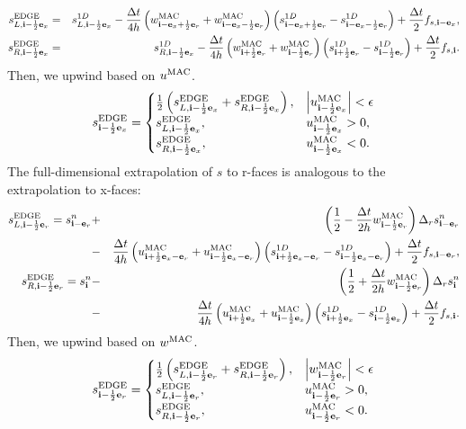 \documentclass[11pt]{article}
\def\half  {\frac{1}{2}}
\def\dt    {\Delta t}
\def\edge  {\rm EDGE}
\def\mac   {\rm MAC}
\def\eb    {{\bf e}}
\def\ib    {{\bf i}}
\begin{document}
\begin{eqnarray}
s_{L,\ib-\half\eb_x}^{\edge} &=& s_{L,\ib-\half\eb_x}^{1D} - \frac{\dt}{4h}\left(w_{\ib-\eb_x+\half\eb_r}^{\mac}+w_{\ib-\eb_x-\half\eb_r}^{\mac}\right)\left(s_{\ib-\eb_x+\half\eb_r}^{1D} - s_{\ib-\eb_x-\half\eb_r}^{1D}\right) + \frac{\dt}{2}f_{s,\ib-\eb_x}, \\
s_{R,\ib-\half\eb_x}^{\edge} &=& s_{R,\ib-\half\eb_x}^{1D} - \frac{\dt}{4h}\left(w_{\ib+\half\eb_r}^{\mac}+w_{\ib-\half\eb_r}^{\mac}\right)\left(s_{\ib+\half\eb_r}^{1D} - s_{\ib-\half\eb_r}^{1D}\right) + \frac{\dt}{2}f_{s,\ib}.
\end{eqnarray}
Then, we upwind based on $u^{\mac}$.
\begin{equation}
s_{\ib-\half\eb_x}^{\edge} =
\begin{cases}
\half\left(s_{L,\ib-\half\eb_x}^{\edge} + s_{R,\ib-\half\eb_x}^{\edge}\right), & \left|u^{\mac}_{\ib-\half\eb_x}\right| < \epsilon \\
s_{L,\ib-\half\eb_x}^{\edge}, & u^{\mac}_{\ib-\half\eb_x} > 0, \\
s_{R,\ib-\half\eb_x}^{\edge}, & u^{\mac}_{\ib-\half\eb_x} < 0.
\end{cases}
\end{equation}
The full-dimensional extrapolation of $s$ to r-faces is analogous to the extrapolation to x-faces:
\begin{eqnarray}
s_{L,\ib-\half\eb_r}^{\edge} = s_{\ib-\eb_r}^n &+& \left(\half - \frac{\dt}{2h}w_{\ib-\half\eb_r}^{\mac}\right)\Delta_r s_{\ib-\eb_r}^n \nonumber \\
&-& \frac{\dt}{4h}\left(u_{\ib+\half\eb_x-\eb_r}^{\mac}+u_{\ib-\half\eb_x-\eb_r}^{\mac}\right)\left(s_{\ib+\half\eb_x-\eb_r}^{1D} - s_{\ib-\half\eb_x-\eb_r}^{1D}\right) + \frac{\dt}{2}f_{s,\ib-\eb_r},  \\
s_{R,\ib-\half\eb_r}^{\edge} = s_{\ib}^n &-& \left(\half + \frac{\dt}{2h}w_{\ib-\half\eb_r}^{\mac}\right)\Delta_r s_{\ib}^n \nonumber \\
&-& \frac{\dt}{4h}\left(u_{\ib+\half\eb_x}^{\mac}+u_{\ib-\half\eb_x}^{\mac}\right)\left(s_{\ib+\half\eb_x}^{1D} - s_{\ib-\half\eb_x}^{1D}\right) + \frac{\dt}{2}f_{s,\ib}. 
\end{eqnarray}
Then, we upwind based on $w^{\mac}$.
\begin{equation}
s_{\ib-\half\eb_r}^{\edge} =
\begin{cases}
\half\left(s_{L,\ib-\half\eb_r}^{\edge} + s_{R,\ib-\half\eb_r}^{\edge}\right), & \left|w^{\mac}_{\ib-\half\eb_r}\right| < \epsilon \\
s_{L,\ib-\half\eb_r}^{\edge}, & u^{\mac}_{\ib-\half\eb_r} > 0, \\
s_{R,\ib-\half\eb_r}^{\edge}, & u^{\mac}_{\ib-\half\eb_r} < 0.
\end{cases}
\end{equation}
\cleardoublepage
\end{document}
